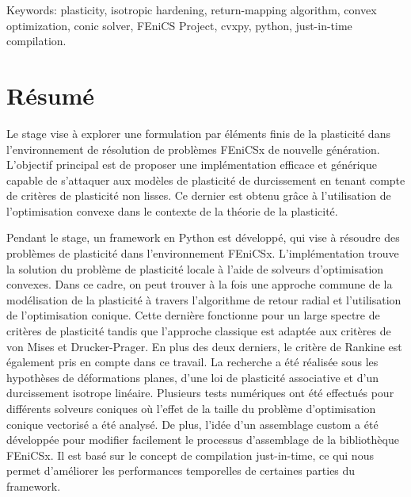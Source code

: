 \documentclass[12pt]{article}
\begin{document}
Keywords: plasticity, isotropic hardening, return-mapping algorithm, convex optimization, conic solver, FEniCS Project, cvxpy, python, just-in-time compilation.

\newpage
\section*{\centering Résumé}

Le stage vise à explorer une formulation par éléments finis de la plasticité dans l'environnement de résolution de problèmes FEniCSx de nouvelle génération. L'objectif principal est de proposer une implémentation efficace et générique capable de s'attaquer aux modèles de plasticité de durcissement en tenant compte de critères de plasticité non lisses. Ce dernier est obtenu grâce à l'utilisation de l'optimisation convexe dans le contexte de la théorie de la plasticité.

Pendant le stage, un framework en Python est développé, qui vise à résoudre des problèmes de plasticité dans l'environnement FEniCSx. L'implémentation trouve la solution du problème de plasticité locale à l'aide de solveurs d'optimisation convexes. Dans ce cadre, on peut trouver à la fois une approche commune de la modélisation de la plasticité à travers l'algorithme de retour radial et l'utilisation de l'optimisation conique. Cette dernière fonctionne pour un large spectre de critères de plasticité tandis que l'approche classique est adaptée aux critères de von Mises et Drucker-Prager. En plus des deux derniers, le critère de Rankine est également pris en compte dans ce travail. La recherche a été réalisée sous les hypothèses de déformations planes, d'une loi de plasticité associative et d'un durcissement isotrope linéaire. Plusieurs tests numériques ont été effectués pour différents solveurs coniques où l'effet de la taille du problème d'optimisation conique vectorisé a été analysé. De plus, l'idée d'un assemblage custom a été développée pour modifier facilement le processus d'assemblage de la bibliothèque FEniCSx. Il est basé sur le concept de compilation just-in-time, ce qui nous permet d'améliorer les performances temporelles de certaines parties du framework.
\end{document}
